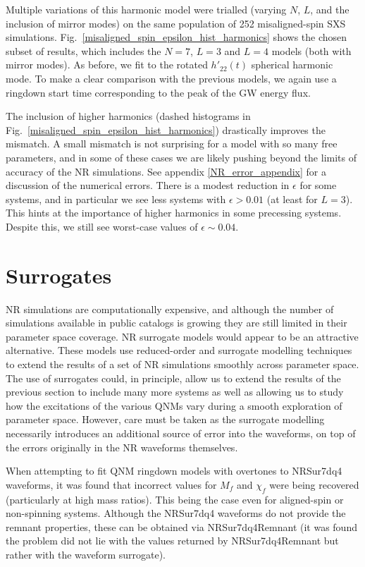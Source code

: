Multiple variations of this harmonic model were trialled (varying $N$, $L$, and the inclusion of mirror modes) on the same population of 252 misaligned-spin SXS simulations.
Fig.~\ref{misaligned_spin_epsilon_hist_harmonics} shows the chosen subset of results, which includes the $N=7$, $L=3$ and $L=4$ models (both with mirror modes). As before, we fit to the rotated $h'_{22}(t)$ spherical harmonic mode.
To make a clear comparison with the previous models, we again use a ringdown start time corresponding to the peak of the GW energy flux.

The inclusion of higher harmonics (dashed histograms in Fig.~\ref{misaligned_spin_epsilon_hist_harmonics}) drastically improves the mismatch.
A small mismatch is not surprising for a model with so many free parameters, and in some of these cases we are likely pushing beyond the limits of accuracy of the NR simulations. See appendix \ref{NR_error_appendix} for a discussion of the numerical errors.
There is a modest reduction in $\epsilon$ for some systems, and in particular we see less systems with $\epsilon > 0.01$ (at least for $L=3$). This hints at the importance of higher harmonics in some precessing systems. Despite this, we still see worst-case values of $\epsilon \sim 0.04$.


\section{Surrogates}\label{surrogate-section}

NR simulations are computationally expensive, and although the number of simulations available in public catalogs is growing they are still limited in their parameter space coverage. 
NR surrogate models \cite{Blackman:2015pia, Blackman:2017pcm, Varma:2019csw, Varma:2018mmi} would appear to be an attractive alternative.
These models use reduced-order and surrogate modelling techniques to extend the results of a set of NR simulations smoothly across parameter space. 
The use of surrogates could, in principle, allow us to extend the results of the previous section to include many more systems as well as allowing us to study how the excitations of the various QNMs vary during a smooth exploration of parameter space.
However, care must be taken as the surrogate modelling necessarily introduces an additional source of error into the waveforms, on top of the errors originally in the NR waveforms themselves.
 
When attempting to fit QNM ringdown models with overtones to NRSur7dq4 \cite{Varma:2019csw} waveforms, it was found that incorrect values for $M_f$ and $\chi_f$ were being recovered (particularly at high mass ratios). This being the case even for aligned-spin or non-spinning systems. Although the NRSur7dq4 waveforms do not provide the remnant properties, these can be obtained via NRSur7dq4Remnant \cite{Varma:2019csw} (it was found the problem did not lie with the values returned by NRSur7dq4Remnant but rather with the waveform surrogate).

